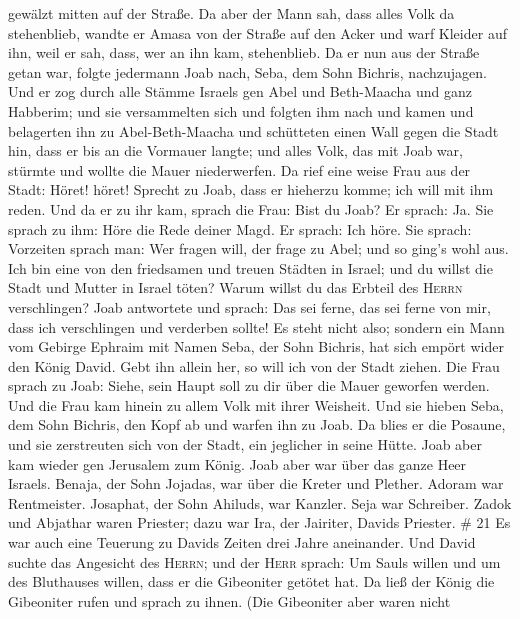 gewälzt mitten auf der Straße. Da aber der Mann sah, dass alles Volk da
stehenblieb, wandte er Amasa von der Straße auf den Acker und warf
Kleider auf ihn, weil er sah, dass, wer an ihn kam, stehenblieb.
 Da er nun aus der Straße getan war, folgte jedermann
Joab nach, Seba, dem Sohn Bichris, nachzujagen.  Und er
zog durch alle Stämme Israels gen Abel und Beth-Maacha und ganz
Habberim; und sie versammelten sich und folgten ihm nach 
und kamen und belagerten ihn zu Abel-Beth-Maacha und schütteten einen
Wall gegen die Stadt hin, dass er bis an die Vormauer langte; und alles
Volk, das mit Joab war, stürmte und wollte die Mauer niederwerfen.
 Da rief eine weise Frau aus der Stadt: Höret! höret!
Sprecht zu Joab, dass er hieherzu komme; ich will mit ihm reden.
 Und da er zu ihr kam, sprach die Frau: Bist du Joab? Er
sprach: Ja. Sie sprach zu ihm: Höre die Rede deiner Magd. Er sprach: Ich
höre.  Sie sprach: Vorzeiten sprach man: Wer fragen will,
der frage zu Abel; und so ging's wohl aus.  Ich bin eine
von den friedsamen und treuen Städten in Israel; und du willst die Stadt
und Mutter in Israel töten? Warum willst du das Erbteil des
\textsc{Herrn} verschlingen?  Joab antwortete und sprach:
Das sei ferne, das sei ferne von mir, dass ich verschlingen und
verderben sollte! Es steht nicht also;  sondern ein Mann
vom Gebirge Ephraim mit Namen Seba, der Sohn Bichris, hat sich empört
wider den König David. Gebt ihn allein her, so will ich von der Stadt
ziehen. Die Frau sprach zu Joab: Siehe, sein Haupt soll zu dir über die
Mauer geworfen werden.  Und die Frau kam hinein zu allem
Volk mit ihrer Weisheit. Und sie hieben Seba, dem Sohn Bichris, den Kopf
ab und warfen ihn zu Joab. Da blies er die Posaune, und sie zerstreuten
sich von der Stadt, ein jeglicher in seine Hütte. Joab aber kam wieder
gen Jerusalem zum König.  Joab aber war über das ganze
Heer Israels. Benaja, der Sohn Jojadas, war über die Kreter und Plether.
 Adoram war Rentmeister. Josaphat, der Sohn Ahiluds, war
Kanzler.  Seja war Schreiber. Zadok und Abjathar waren
Priester;  dazu war Ira, der Jairiter, Davids Priester.
\# 21  Es war auch eine Teuerung zu Davids Zeiten drei
Jahre aneinander. Und David suchte das Angesicht des \textsc{Herrn}; und
der \textsc{Herr} sprach: Um Sauls willen und um des Bluthauses willen,
dass er die Gibeoniter getötet hat.  Da ließ der König die
Gibeoniter rufen und sprach zu ihnen. (Die Gibeoniter aber waren nicht
